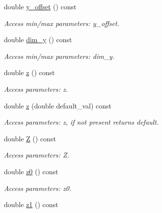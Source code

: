 \begin{DoxyCompactItemize}
double \hyperlink{struct_d_d4hep_1_1_x_m_l_1_1_child_value_aa7b943238e215a0958a1143084814f04}{y\_\-offset} () const 
\begin{DoxyCompactList}\small\item\em Access min/max parameters: y\_\-offset. \item\end{DoxyCompactList}\item 
double \hyperlink{struct_d_d4hep_1_1_x_m_l_1_1_child_value_a7ca927dcbd6ff1c2e6362567cf0f1019}{dim\_\-y} () const 
\begin{DoxyCompactList}\small\item\em Access min/max parameters: dim\_\-y. \item\end{DoxyCompactList}\item 
double \hyperlink{struct_d_d4hep_1_1_x_m_l_1_1_child_value_a2d3ea2df66ead260e1b8778537a4ec3e}{z} () const 
\begin{DoxyCompactList}\small\item\em Access parameters: z. \item\end{DoxyCompactList}\item 
double \hyperlink{struct_d_d4hep_1_1_x_m_l_1_1_child_value_ab69c51a9ae6ae6f93a073f80d069aa2a}{z} (double default\_\-val) const 
\begin{DoxyCompactList}\small\item\em Access parameters: z, if not present returns default. \item\end{DoxyCompactList}\item 
double \hyperlink{struct_d_d4hep_1_1_x_m_l_1_1_child_value_a98529f5536296558e3580cebb183f1fc}{Z} () const 
\begin{DoxyCompactList}\small\item\em Access parameters: Z. \item\end{DoxyCompactList}\item 
double \hyperlink{struct_d_d4hep_1_1_x_m_l_1_1_child_value_afba829246b597d2d2204db27c475bf3d}{z0} () const 
\begin{DoxyCompactList}\small\item\em Access parameters: z0. \item\end{DoxyCompactList}\item 
double \hyperlink{struct_d_d4hep_1_1_x_m_l_1_1_child_value_ae5f97575617ff0d84d4c1cce01f94d31}{z1} () const 

\end{DoxyCompactItemize}
